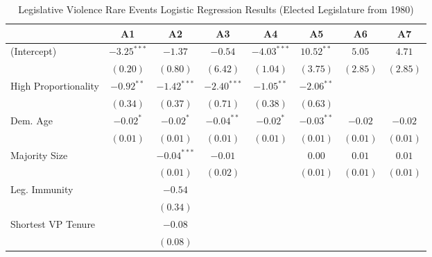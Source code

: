 \documentclass[a4paper]{article}\usepackage{graphicx, color}
\begin{document}
\begin{table}
\caption{Legislative Violence Rare Events Logistic Regression Results (Elected Legislature from 1980)}
\label{outputTable.dem}
\begin{center}

\begin{tabular}{l c c c c c c c }
\hline
                         & A1 & A2 & A3 & A4 & A5 & A6 & A7 \\
\hline
(Intercept)              & $-3.25^{***}$ & $-1.37$       & $-0.54$       & $-4.03^{***}$ & $10.52^{**}$  & $5.05$             & $4.71$            \\
                         & $(0.20)$      & $(0.80)$      & $(6.42)$      & $(1.04)$      & $(3.75)$      & $(2.85)$           & $(2.85)$          \\
High Proportionality     & $-0.92^{**}$  & $-1.42^{***}$ & $-2.40^{***}$ & $-1.05^{**}$  & $-2.06^{**}$  &                    &                   \\
                         & $(0.34)$      & $(0.37)$      & $(0.71)$      & $(0.38)$      & $(0.63)$      &                    &                   \\
Dem. Age                 & $-0.02^{*}$   & $-0.02^{*}$   & $-0.04^{**}$  & $-0.02^{*}$   & $-0.03^{**}$  & $-0.02$            & $-0.02$           \\
                         & $(0.01)$      & $(0.01)$      & $(0.01)$      & $(0.01)$      & $(0.01)$      & $(0.01)$           & $(0.01)$          \\
Majority Size            &               & $-0.04^{***}$ & $-0.01$       &               & $0.00$        & $0.01$             & $0.01$            \\
                         &               & $(0.01)$      & $(0.02)$      &               & $(0.01)$      & $(0.01)$           & $(0.01)$          \\
Leg. Immunity            &               & $-0.54$       &               &               &               &                    &                   \\
                         &               & $(0.34)$      &               &               &               &                    &                   \\
Shortest VP Tenure       &               & $-0.08$       &               &               &               &                    &                   \\
                         &               & $(0.08)$      &               &               &               &                    &                   \\

\end{tabular}
\end{center}
\end{table}
\end{document}
